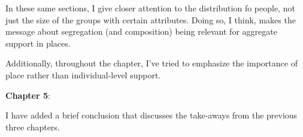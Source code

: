 \documentclass[12pt,stdletter,dateno,sigleft]{newlfm} %
\begin{document}
\begin{newlfm}
In these same sections, I give closer attention to the distribution fo people, not just the size of the groups with certain attributes. Doing so, I think, makes the message about segregation (and composition) being relevant for aggregate support in places.

Additionally, throughout the chapter, I've tried to emphasize the importance of place rather than individual-level support. 


\textbf{Chapter 5}: 

I have added a brief conclusion that discusses the take-aways from the previous three chapters.



\end{newlfm}
\end{document}
